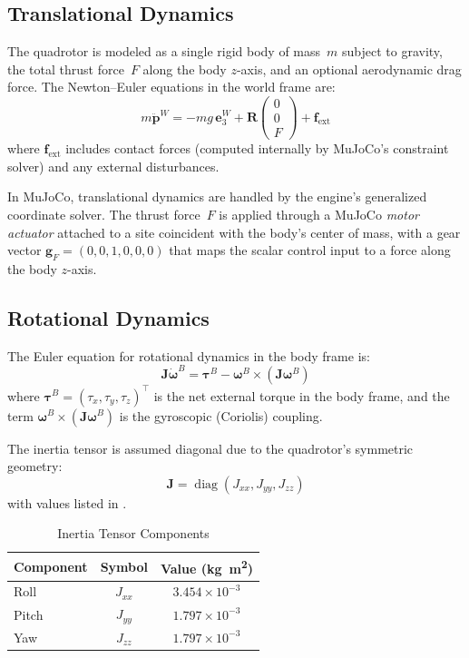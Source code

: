 \documentclass[journal]{IEEEtran}
\newcommand{\R}{\mathbf{R}}
\newcommand{\J}{\mathbf{J}}
\newcommand{\bomega}{\boldsymbol{\omega}}
\newcommand{\btau}{\boldsymbol{\tau}}
\newcommand{\diag}{\operatorname{diag}}
\begin{document}
\subsection{Translational Dynamics}

The quadrotor is modeled as a single rigid body of mass~$m$ subject to gravity, the total thrust force~$F$ along the body $z$-axis, and an optional aerodynamic drag force. The Newton--Euler equations in the world frame are:
\begin{equation}
  m \ddot{\mathbf{p}}^W = -m g \, \mathbf{e}_3^W + \R \begin{pmatrix} 0 \\ 0 \\ F \end{pmatrix} + \mathbf{f}_{\text{ext}}
  \label{eq:translational}
\end{equation}
where $\mathbf{f}_{\text{ext}}$ includes contact forces (computed internally by MuJoCo's constraint solver) and any external disturbances.

In MuJoCo, translational dynamics are handled by the engine's generalized coordinate solver. The thrust force~$F$ is applied through a MuJoCo \emph{motor actuator} attached to a site coincident with the body's center of mass, with a gear vector $\mathbf{g}_F = (0, 0, 1, 0, 0, 0)$ that maps the scalar control input to a force along the body $z$-axis.

\subsection{Rotational Dynamics}

The Euler equation for rotational dynamics in the body frame is:
\begin{equation}
  \J \dot{\bomega}^B = \btau^B - \bomega^B \times (\J \bomega^B)
  \label{eq:rotational}
\end{equation}
where $\btau^B = (\tau_x, \tau_y, \tau_z)^\top$ is the net external torque in the body frame, and the term $\bomega^B \times (\J \bomega^B)$ is the gyroscopic (Coriolis) coupling.

The inertia tensor is assumed diagonal due to the quadrotor's symmetric geometry:
\begin{equation}
  \J = \diag(J_{xx}, J_{yy}, J_{zz})
  \label{eq:inertia}
\end{equation}
with values listed in .

\begin{table}[!t]
  \centering
  \caption{Inertia Tensor Components}
  \label{tab:inertia}
  \begin{tabular}{@{}lcc@{}}
    \toprule
    Component & Symbol & Value (\si{kg.m^2}) \\
    \midrule
    Roll & $J_{xx}$ & $3.454 \times 10^{-3}$ \\
    Pitch & $J_{yy}$ & $1.797 \times 10^{-3}$ \\
    Yaw & $J_{zz}$ & $1.797 \times 10^{-3}$ \\
    \bottomrule
  \end{tabular}
\end{table}
\end{document}
